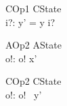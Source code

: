 \begin{schema}{COp1}
   \Delta CState \\
   i?: \nat
\where
   y' = y \cat \langle i? \rangle
\end{schema}

\begin{schema}{AOp2}
   \Xi AState \\
   o!: \nat
\where
    o! \in  x'
\end{schema}

\begin{schema}{COp2}
   \Xi CState \\
   o!: \nat
\where
   o! \in \ran~y'
\end{schema}
